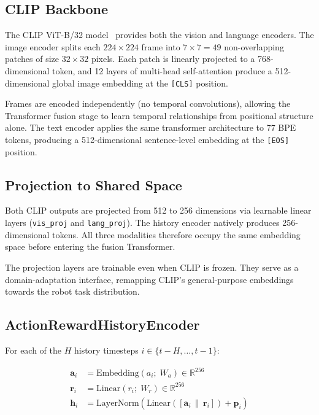 \documentclass[12pt, a4paper]{article}
\begin{document}
\subsection{CLIP Backbone}

The CLIP ViT-B/32 model~\cite{radford2021clip} provides both the vision and
language encoders.
The image encoder splits each $224\times224$ frame into $7\times7 = 49$
non-overlapping patches of size $32\times32$ pixels.
Each patch is linearly projected to a 768-dimensional token, and 12 layers
of multi-head self-attention produce a 512-dimensional global image embedding
at the \texttt{[CLS]} position.

Frames are encoded independently (no temporal convolutions), allowing the
Transformer fusion stage to learn temporal relationships from positional
structure alone.
The text encoder applies the same transformer architecture to 77 BPE tokens,
producing a 512-dimensional sentence-level embedding at the \texttt{[EOS]}
position.

\subsection{Projection to Shared Space}

Both CLIP outputs are projected from 512 to 256 dimensions via learnable
linear layers (\texttt{vis\_proj} and \texttt{lang\_proj}).
The history encoder natively produces 256-dimensional tokens.
All three modalities therefore occupy the same embedding space before
entering the fusion Transformer.

\begin{notebox}
  The projection layers are trainable even when CLIP is frozen.
  They serve as a domain-adaptation interface, remapping CLIP's
  general-purpose embeddings towards the robot task distribution.
\end{notebox}

\subsection{ActionRewardHistoryEncoder}

For each of the $H$ history timesteps $i \in \{t-H,\ldots,t-1\}$:

\begin{align}
  \mathbf{a}_i &= \mathrm{Embedding}(a_i;\; W_a) \in \mathbb{R}^{256} \\
  \mathbf{r}_i &= \mathrm{Linear}(r_i;\; W_r) \in \mathbb{R}^{256} \\
  \mathbf{h}_i &= \mathrm{LayerNorm}\!\left(
      \mathrm{Linear}([\mathbf{a}_i\,\|\,\mathbf{r}_i]) + \mathbf{p}_i
    \right)
\end{align}
\end{document}
